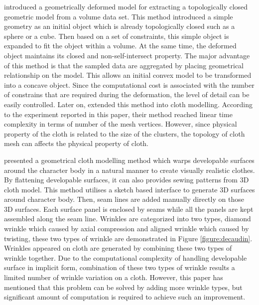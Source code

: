  introduced a geometrically deformed model for extracting a topologically closed geometric model from a volume data set. This method introduced a simple geometry as an initial object which is already topologically closed such as a sphere or a cube. Then based on a set of constraints, this simple object is expanded to fit the object within a volume. At the same time, the deformed object maintains its closed and non-self-intersect property. The major advantage of this method is that the sampled data are aggregated by placing geometrical relationship on the model. This allows an initial convex model to be transformed into a concave object. Since the computational cost is associated with the number of constrains that are required during the deformation, the level of detail can be easily controlled. Later on,  extended this method into cloth modelling. According to the experiment reported in this paper, their method reached linear time complexity in terms of number of the mesh vertices. However, since physical property of the cloth is related to the size of the clusters, the topology of cloth mesh can affects the physical property of cloth. 


 presented a geometrical cloth modelling method which warps developable surfaces around the character body in a natural manner to create visually realistic clothes. By flattening developable surfaces, it can also provides sewing patterns from 3D cloth model. This method utilises a sketch based interface to generate 3D surfaces around character body. Then, seam lines are added manually directly on those 3D surfaces. Each surface panel is enclosed by seams while all the panels are kept assembled along the seam line. Wrinkles are categorized into two types, diamond wrinkle which caused by axial compression and aligned wrinkle which caused by twisting, these two types of wrinkle are demonstrated in Figure \ref{figure:decaudin}. Wrinkles appeared on cloth are generated by combining these two types of wrinkle together. Due to the computational complexity of handling developable surface in implicit form, combination of these two types of wrinkle results a limited number of wrinkle variation on a cloth. However, this paper has mentioned that this problem can be solved by adding more wrinkle types, but significant amount of computation is required to achieve such an improvement.

